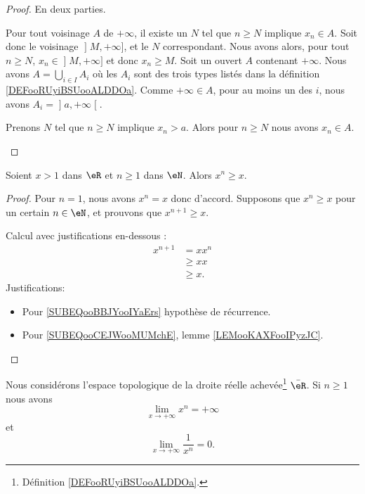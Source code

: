 \begin{proof}
	En deux parties.
	\begin{subproof}
		\spitem[\( \Rightarrow\)]
		Pour tout voisinage \( A\) de \( +\infty\), il existe un \( N\) tel que \( n\geq N\) implique \( x_n\in A\). Soit donc le voisinage \( \mathopen] M , +\infty \mathclose]\), et le \( N\) correspondant. Nous avons alors, pour tout \( n\geq N\), \( x_n\in \mathopen] M , +\infty \mathclose]\) et donc \( x_n\geq M\).
		\spitem[\( \Leftarrow\)]
		Soit un ouvert \( A\) contenant \( +\infty\). Nous avons \( A=\bigcup_{i\in I} A_i\) où les \( A_i\) sont des trois types listés dans la définition \ref{DEFooRUyiBSUooALDDOa}. Comme \( +\infty\in A\), pour au moins un des \( i\), nous avons \( A_i=\mathopen] a , +\infty \mathclose[\).

		Prenons \( N\) tel que \( n\geq N\) implique \( x_n>a\). Alors pour \( n\geq N\) nous avons \( x_n\in A\).
	\end{subproof}
\end{proof}


\begin{lemma}        \label{LEMooUBFAooEmquQQ}
	Soient \( x>1\) dans \( \eR\) et \( n\geq 1\) dans \( \eN\). Alors \( x^n \geq x\).
\end{lemma}

\begin{proof}
	Pour \( n=1\), nous avons \( x^n=x\) donc d'accord. Supposons que \( x^n\geq x\) pour un certain \( n\in \eN\), et prouvons que \( x^{n+1}\geq x\).

	Calcul avec justifications en-dessous :
	\begin{subequations}
		\begin{align}
			x^{n+1} & =xx^n                                      \\
			        & \geq xx        \label{SUBEQooBBJYooIYaErs} \\
			        & \geq x.        \label{SUBEQooCEJWooMUMchE}
		\end{align}
	\end{subequations}
	Justifications:
	\begin{itemize}
		\item Pour \eqref{SUBEQooBBJYooIYaErs} hypothèse de récurrence.
		\item Pour \eqref{SUBEQooCEJWooMUMchE}, lemme \ref{LEMooKAXFooIPyzJC}.
	\end{itemize}
\end{proof}

\begin{lemma}       \label{LEMooFCIXooJuHFqk}
	Nous considérons l'espace topologique de la droite réelle achevée\footnote{Définition \ref{DEFooRUyiBSUooALDDOa}.} \( \bar \eR\). Si \( n\geq 1\) nous avons
	\begin{equation}        \label{EQooRRFEooLYcuRP}
		\lim_{x\to +\infty} x^n = +\infty
	\end{equation}
	et
	\begin{equation}
		\lim_{x\to +\infty} \frac{1}{ x^n }=0.
	\end{equation}
\end{lemma}

